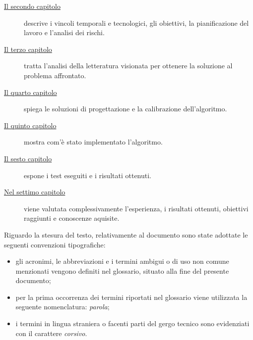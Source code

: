 \begin{description}
    \item[{\hyperref[cap:processi-metodologie]{Il secondo capitolo}}] descrive i vincoli temporali e tecnologici, gli obiettivi, la pianificazione del lavoro e l'analisi dei rischi.
    
    \item[{\hyperref[cap:descrizione-stage]{Il terzo capitolo}}] tratta l'analisi della letteratura visionata per ottenere la soluzione al problema affrontato.
    
    \item[{\hyperref[cap:analisi-requisiti]{Il quarto capitolo}}] spiega le soluzioni di progettazione e la calibrazione dell'algoritmo.
    
    \item[{\hyperref[cap:progettazione-codifica]{Il quinto capitolo}}] mostra com'è stato implementato l'algoritmo.
    
    \item[{\hyperref[cap:verifica-validazione]{Il sesto capitolo}}] espone i test eseguiti e i risultati ottenuti.
    
    \item[{\hyperref[cap:conclusioni]{Nel settimo capitolo}}] viene valutata complessivamente l'esperienza, i risultati ottenuti, obiettivi raggiunti e conoscenze aquisite.
\end{description}

Riguardo la stesura del testo, relativamente al documento sono state adottate le seguenti convenzioni tipografiche:
\begin{itemize}
	\item gli acronimi, le abbreviazioni e i termini ambigui o di uso non comune menzionati vengono definiti nel glossario, situato alla fine del presente documento;
	\item per la prima occorrenza dei termini riportati nel glossario viene utilizzata la seguente nomenclatura: \emph{parola}\glsfirstoccur;
	\item i termini in lingua straniera o facenti parti del gergo tecnico sono evidenziati con il carattere \emph{corsivo}.
\end{itemize}
